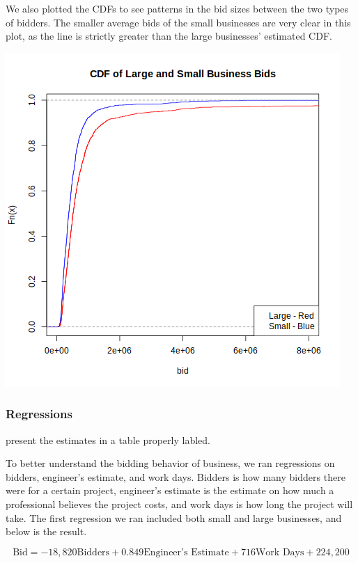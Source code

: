 We also plotted the CDFs to see patterns in the bid sizes between
the two types of bidders. The smaller average bids of
the small businesses are very clear in this plot, as the line is strictly
greater than the large businesses' estimated CDF.

% 

\includegraphics[scale=0.75]{cdf.png}

\subsubsection{Regressions}

present the estimates in a table properly labled.

To better understand the bidding behavior of business, we ran regressions on
bidders, engineer’s estimate, and work days. Bidders is how many bidders there
were for a certain project, engineer’s estimate is the estimate on how much a
professional believes the project costs, and work days is how long the project
will take. The first regression we ran included both small and large
businesses, and below is the result.

\[
\text{Bid} = -18,820 \text{Bidders} + 0.849 \text{Engineer’s Estimate} +
716 \text{Work Days} + 224,200
\]

